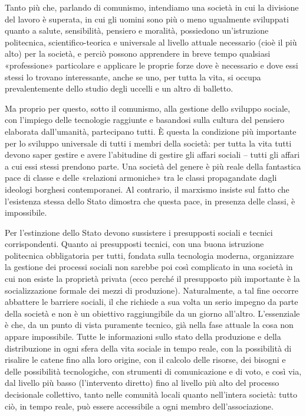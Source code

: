 \documentclass[12pt,a4paper,openany]{book}
\begin{document}
Tanto più che, parlando di comunismo, intendiamo una società in cui la divisione del lavoro è superata, in cui gli uomini sono più o meno ugualmente sviluppati quanto a salute, sensibilità, pensiero e moralità, possiedono un'istruzione politecnica, scientifico-teorica e universale al livello attuale necessario (cioè il più alto) per la società, e perciò possono apprendere in breve tempo qualsiasi «professione» particolare e applicare le proprie forze dove è necessario e dove essi stessi lo trovano interessante, anche se uno, per tutta la vita, si occupa prevalentemente dello studio degli uccelli e un altro di balletto.

Ma proprio per questo, sotto il comunismo, alla gestione dello sviluppo sociale, con l'impiego delle tecnologie raggiunte e basandosi sulla cultura del pensiero elaborata dall'umanità, partecipano tutti. È questa la condizione più importante per lo sviluppo universale di tutti i membri della società: per tutta la vita tutti devono saper gestire e avere l'abitudine di gestire gli affari sociali – tutti gli affari a cui essi stessi prendono parte. Una società del genere è più reale della fantastica pace di classe e delle «relazioni armoniche» tra le classi propagandate dagli ideologi borghesi contemporanei. Al contrario, il marxismo insiste sul fatto che l'esistenza stessa dello Stato dimostra che questa pace, in presenza delle classi, è impossibile.

Per l'estinzione dello Stato devono sussistere i presupposti sociali e tecnici corrispondenti. Quanto ai presupposti tecnici, con una buona istruzione politecnica obbligatoria per tutti, fondata sulla tecnologia moderna, organizzare la gestione dei processi sociali non sarebbe poi così complicato in una società in cui non esiste la proprietà privata (ecco perché il presupposto più importante è la socializzazione formale dei mezzi di produzione). Naturalmente, a tal fine occorre abbattere le barriere sociali, il che richiede a sua volta un serio impegno da parte della società e non è un obiettivo raggiungibile da un giorno all'altro. L'essenziale è che, da un punto di vista puramente tecnico, già nella fase attuale la cosa non appare impossibile. Tutte le informazioni sullo stato della produzione e della distribuzione in ogni sfera della vita sociale in tempo reale, con la possibilità di risalire le catene fino alla loro origine, con il calcolo delle risorse, dei bisogni e delle possibilità tecnologiche, con strumenti di comunicazione e di voto, e così via, dal livello più basso (l'intervento diretto) fino al livello più alto del processo decisionale collettivo, tanto nelle comunità locali quanto nell'intera società: tutto ciò, in tempo reale, può essere accessibile a ogni membro dell'associazione.
\end{document}
